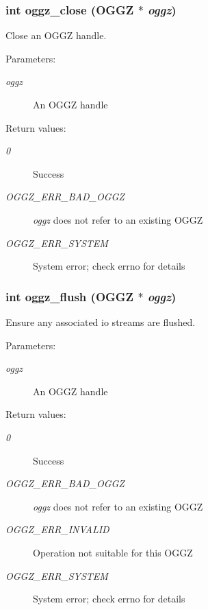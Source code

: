 \subsubsection{\setlength{\rightskip}{0pt plus 5cm}int oggz\_\-close ({\bf OGGZ} $\ast$ {\em oggz})}\label{oggz_8h_a8}


Close an OGGZ handle. 

\begin{Desc}
\item[Parameters:]
\begin{description}
\item[{\em oggz}]An OGGZ handle \end{description}
\end{Desc}
\begin{Desc}
\item[Return values:]
\begin{description}
\item[{\em 0}]Success \item[{\em OGGZ\_\-ERR\_\-BAD\_\-OGGZ}]{\em oggz\/} does not refer to an existing OGGZ \item[{\em OGGZ\_\-ERR\_\-SYSTEM}]System error; check errno for details \end{description}
\end{Desc}
\subsubsection{\setlength{\rightskip}{0pt plus 5cm}int oggz\_\-flush ({\bf OGGZ} $\ast$ {\em oggz})}\label{oggz_8h_a7}


Ensure any associated io streams are flushed. 

\begin{Desc}
\item[Parameters:]
\begin{description}
\item[{\em oggz}]An OGGZ handle \end{description}
\end{Desc}
\begin{Desc}
\item[Return values:]
\begin{description}
\item[{\em 0}]Success \item[{\em OGGZ\_\-ERR\_\-BAD\_\-OGGZ}]{\em oggz\/} does not refer to an existing OGGZ \item[{\em OGGZ\_\-ERR\_\-INVALID}]Operation not suitable for this OGGZ \item[{\em OGGZ\_\-ERR\_\-SYSTEM}]System error; check errno for details \end{description}
\end{Desc}
